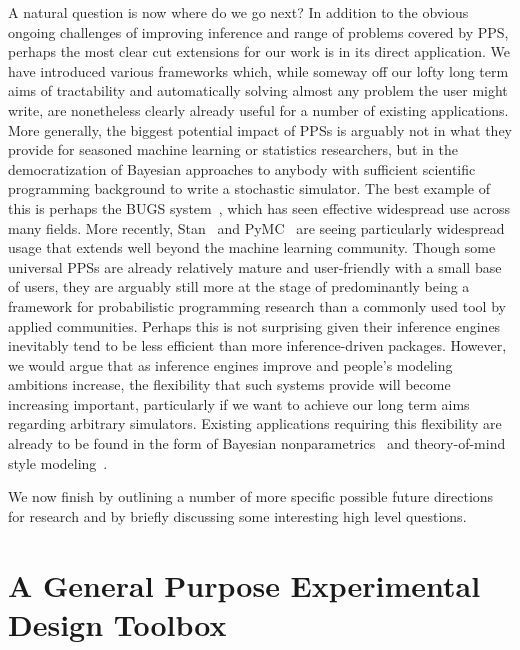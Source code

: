 A natural question is now where do we go next?  In addition to the obvious ongoing challenges
of improving inference and range of problems covered by PPS, perhaps the most clear cut 
extensions for our
work is in its direct application.  We have introduced various frameworks which, while someway off
our lofty long term aims of tractability and automatically solving almost any problem the 
user might write, are nonetheless clearly already useful for a number of existing applications.  
More generally, the biggest
potential impact of PPSs is arguably not in what they provide for seasoned machine learning or 
statistics researchers, but in the democratization of Bayesian approaches to anybody with sufficient
scientific programming background to write a stochastic simulator.  The best example of this is
perhaps the BUGS system~\cite{spiegelhalter1996bugs}, which has seen effective widespread use across
many fields.
More recently, Stan~\cite{carpenter2015stan} and PyMC~\citep{salvatier2016probabilistic} 
are seeing particularly widespread usage that extends well beyond
the machine learning community.  Though some universal PPSs are already relatively 
mature and user-friendly with a small base of users, they are arguably still more
at the stage of predominantly being a framework for probabilistic programming
research than a commonly used tool by applied communities.  Perhaps this is not surprising given
their inference engines inevitably tend to be less efficient than more inference-driven packages.
However, we would argue that as inference engines improve and people's modeling ambitions
increase, the flexibility that such systems provide will become increasing important,
particularly if we want to achieve our long term aims regarding arbitrary simulators.
Existing applications requiring this flexibility are already to be found in the form of Bayesian
nonparametrics~\citep{dhir2017interpreting} and theory-of-mind style 
modeling~\citep{stuhlmuller2014reasoning}.

We now finish by outlining a number of more specific possible future directions for research
and by briefly discussing some interesting high level questions.

\section{A General Purpose Experimental Design Toolbox}
\label{sec:disc:design}

